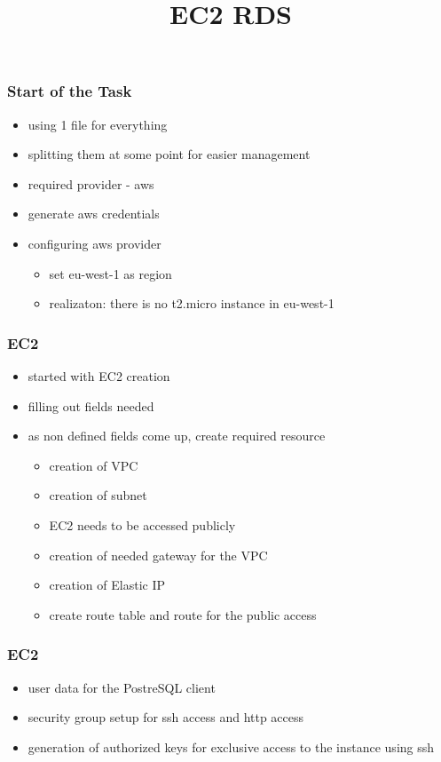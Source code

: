 \documentclass{beamer}
\title{EC2 RDS}
\begin{document}
\date{}
\frame{\titlepage}

	\begin{frame}
		\frametitle{Start of the Task}
		\begin{itemize}
		\item using 1 file for everything
		\item splitting them at some point for easier management
		\item required provider - aws
		\item generate aws credentials
		\item configuring aws provider
			\begin{itemize}
				\item set eu-west-1 as region
				\item realizaton: there is no t2.micro instance in eu-west-1
			\end{itemize}
		\end{itemize}
	\end{frame}

	\begin{frame}
		\frametitle{EC2}	
		\begin{itemize}
			\item started with EC2 creation
			\item filling out fields needed
			\item as non defined fields come up, create required resource
			\begin{itemize}
				\item creation of VPC 
				\item creation of subnet
				\item EC2 needs to be accessed publicly
				\item creation of needed gateway for the VPC
				\item creation of Elastic IP
				\item create route table and route for the public access
			\end{itemize}
		\end{itemize}
	\end{frame}

	\begin{frame}
		\frametitle{EC2}
		\begin{itemize}
				\item user data for the PostreSQL client
				\item security group setup for ssh access and http access
				\item generation of authorized keys for exclusive access to the instance using ssh
			
		\end{itemize}
		
	\end{frame}
\end{document}
